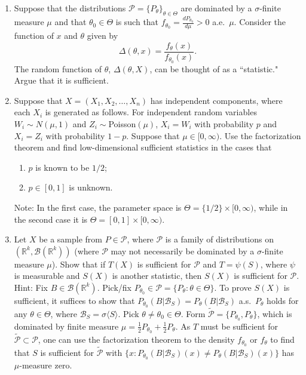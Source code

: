 \documentclass[11pt]{article}
\begin{document}
\begin{enumerate}
\item Suppose that the distributions $\mathcal{P}=\{P_\theta\}_{\theta \in \Theta}$ are dominated by a $\sigma$-finite measure $\mu$ and that
$\theta_0\in\Theta$ is such that $f_{\theta_0} = \frac{d P_{\theta_0}}{d \mu}>0$ a.e.~$\mu$.  Consider the function of $x$ and $\theta$ given by
\[
\Delta(\theta,x) = \frac{f_\theta(x)}{f_{\theta_0}(x)}.
\]
The random function of $\theta$, $\Delta(\theta,X)$, can be thought of as a ``statistic."  Argue that it is sufficient.

\item Suppose that $X=(X_1,X_2,\ldots,X_n)$ has independent components, where each $X_i$ is generated as follows.  For independent random variables $W_i\sim N(\mu,1)$  and $Z_i \sim $Poisson$(\mu)$, $X_i=W_i$ with probability $p$ and $X_i=Z_i$ with probability $1-p$.  Suppose that $\mu\in[0,\infty)$.  Use the factorization theorem and find low-dimensional sufficient statistics in the cases that
    \begin{enumerate}
      \item $p$ is known to be $1/2$;
      \item $p\in[0,1]$ is unknown.
    \end{enumerate}
    Note: In the first case, the parameter space is $\Theta =\{1/2\}\times [0,\infty)$, while in the second case it is  $\Theta =[0,1]\times [0,\infty)$.
\item Let $X$ be a sample from $P\in\mathcal{P}$, where $\mathcal{P}$ is a family of distributions on $(\mathbb{R}^k,\mathcal{B}(\mathbb{R}^k))$ (where $\mathcal{P}$ may not necessarily be dominated by a $\sigma$-finite measure $\mu$).  Show that if $T(X)$ is sufficient for $\mathcal{P}$ and $T=\psi(S)$, where $\psi$ is measurable and $S(X)$ is another statistic, then $S(X)$ is sufficient for $\mathcal{P}$.\\[.2cm]
Hint: Fix $B\in \mathcal{B}(\mathbb{R}^k)$.  Pick/fix $P_{\theta_0} \in \mathcal{P}=\{P_\theta:\theta\in \Theta\}$.  To prove $S(X)$ is sufficient, it suffices to show that $P_{\theta_0}(B|\mathcal{B}_S)=P_{\theta}(B|\mathcal{B}_S)$ a.s.~$P_\theta$ holds for any $\theta \in \Theta$, where $\mathcal{B}_S = \sigma\langle S\rangle$.
Pick $\theta \neq \theta_0\in \Theta$.
Form $\tilde{\mathcal{P}}=\{P_{\theta_0},P_\theta\}$, which is dominated by finite measure $\mu = \frac{1}{2}P_{\theta_0} + \frac{1}{2}P_{\theta}$. As  $T$ must be sufficient for $\tilde{\mathcal{P}} \subset \mathcal{P}$, one can use the factorization theorem to the density $f_{\theta_0}$ or $f_{\theta}$ to find that $S$ is sufficient for $\tilde{\mathcal{P}}$ with $\{x: P_{\theta_0}(B|\mathcal{B}_S)(x)\neq P_{\theta}(B|\mathcal{B}_S)(x)\}$ has $\mu$-measure zero.  



\end{enumerate}
\end{document}
